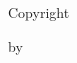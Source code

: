 \thispagestyle{empty}
\null
\vfill
\begin{center}
Copyright \textcopyright\par
by \AuthorName\par
\DegreeYear
\end{center}
\vfill
\null
\clearpage
